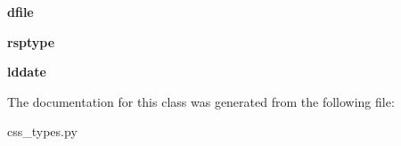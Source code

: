 \begin{DoxyCompactItemize}
\item 
\hypertarget{classcss__types_1_1instrument30_a302710c20362d9a85d49ed6da0c755c1}{}{\bfseries dfile}\label{classcss__types_1_1instrument30_a302710c20362d9a85d49ed6da0c755c1}

\item 
\hypertarget{classcss__types_1_1instrument30_a39cb170592205b0e579b7cfe601acdc5}{}{\bfseries rsptype}\label{classcss__types_1_1instrument30_a39cb170592205b0e579b7cfe601acdc5}

\item 
\hypertarget{classcss__types_1_1instrument30_a2f9216707aad0de84cfc937e188081b0}{}{\bfseries lddate}\label{classcss__types_1_1instrument30_a2f9216707aad0de84cfc937e188081b0}

\end{DoxyCompactItemize}


The documentation for this class was generated from the following file\+:\begin{DoxyCompactItemize}
\item 
css\+\_\+types.\+py\end{DoxyCompactItemize}
